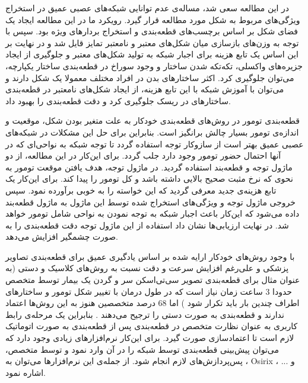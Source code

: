  در این مطالعه سعی شد، مساله‌ی عدم توانایی شبکه‌های عصبی عمیق در استخراج ویژگی‌های مربوط به شکل مورد مطالعه قرار گیرد. رویکرد ما در این مطالعه ایجاد یک فضای شکل بر اساس برچسب‌های قطعه‌بندی و استخراج بردارهای ویژه بود. سپس با توجه به وزن‌های بازسازی میان شکل‌های معتبر و نامعتبر تمایز قایل شد و در نهایت بر این اساس یک تابع هزینه برای اجبار شبکه به تولید شکل‌های معتبر و جلوگیری از ایجاد جزیره‌های واکسلی، تکه‌تکه شدن ساختار و وجود سوراخ در قطعه‌بندی ساختار یکپارچه، می‌توان جلوگیری کرد. اکثر ساختارهای بدن در افراد مختلف معمولا یک شکل دارند و می‌توان با آموزش شبکه با این تابع هزینه، از ایجاد شکل‌های نامعتبر در قطعه‌بندی ساختارهای در ریسک جلوگیری کرد و دقت قطعه‌بندی را بهبود داد.

 قطعه‌بندی تومور در روش‌های قطعه‌بندی خودکار به علت متغیر بودن شکل، موقعیت و اندازه‌ی تومور بسیار چالش برانگیز است. بنابراین برای حل این مشکلات در شبکه‌های عصبی عمیق بهتر است از سازوکار توجه استفاده گردد تا توجه شبکه به نواحی‌ای که در آنها احتمال حضور تومور وجود دارد جلب گردد. برای این‌کار در این مطالعه، از دو ماژول توجه و قطعه‌بند استفاده گردید. در ماژول توجه، هدف یافتن موقعت تومور به نحوی که نرخ مثبت صحیح بالایی داشته باشد و کل تومور را پیدا کند. برای این‌کار یک تابع هزینه‌ی جدید معرفی گردید که این خواسته را به خوبی برآورده نمود. سپس خروجی ماژول توجه و ویژگی‌های استخراج شده توسط این ماژول به ماژول قطعه‌بند داده می‌شود که این‌کار باعث اجبار شبکه به توجه نمودن به نواحی شامل تومور خواهد شد. در نهایت ارزیابی‌ها نشان داد استفاده از این ماژول توجه دقت قطعه‌بندی را به صورت چشمگیر افزایش می‌دهد.

با وجود روش‌های خودکار ارایه شده بر اساس یادگیری عمیق برای قطعه‌بندی تصاویر پزشکی و علی‌رغم افزایش سرعت و دقت نسبت به روش‌های کلاسیک و دستی (به عنوان مثال برای قطعه‌بندی تصویر سی‌تی‌اسکن سر و گردن یک بیمار توسط متخصص حدودا 3 ساعت زمان نیاز است که در طول درمان با تغییر شکل تومور و ساختارهای اطراف چندین بار باید تکرار شود  ) اما 68 درصد متخصصین هنوز به این روش‌ها اعتماد ندارند و قطعه‌بندی به صورت دستی را ترجیح می‌دهند . بنابراین یک مرحله‌ی رابط کاربری به عنوان نظارت متخصص در قطعه‌بندی پس از قطعه‌بندی به صورت اتوماتیک لازم است تا اعتمادسازی صورت گیرد. برای این‌کار نرم‌افزارهای زیادی وجود دارد که می‌توان پیش‌بینی قطعه‌بندی توسط شبکه را در آن وارد نمود و توسط متخصص، پس‌پردازش‌های لازم انجام شود. از جمله‌ی این نرم‌افزارها می‌توان به  ، Osirix  ،  و ... اشاره نمود.

